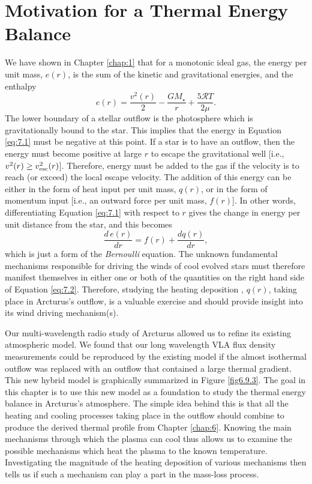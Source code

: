 \section{Motivation for a Thermal Energy Balance}\label{sec:7.1}
We have shown in Chapter \ref{chap:1} that for a monotonic ideal gas, the energy per unit mass, $e(r)$, is the sum of the kinetic and gravitational energies, and the enthalpy
\begin{equation}
\label{eq:7.1}
e(r)=\frac{v^2(r)}{2}-\frac{GM_{\star}}{r}+\frac{5\mathcal{R}T}{2\mu}.
\end{equation}
The lower boundary of a stellar outflow is the photosphere which is gravitationally bound to the star. This implies that the energy in Equation \ref{eq:7.1} must be negative at this point. If a star is to have an outflow, then the energy must become positive at large $r$ to escape the gravitational well [i.e., $v^2(r) \geq v_{\rm{esc}}^2(r)$]. Therefore, energy must be added to the gas if the velocity is to reach (or exceed) the local escape velocity. The addition of this energy can be either in the form of heat input per unit mass, $q(r)$, or in the form of momentum input [i.e., an outward force per unit mass, $f(r)$]\citep{lamers_1999}. In other words, differentiating Equation \ref{eq:7.1} with respect to $r$ gives the change in energy per unit distance from the star, and this becomes
\begin{equation}
\label{eq:7.2}
\frac{d\,e(r)}{dr}=f(r)+\frac{dq(r)}{dr},
\end{equation}
which is just a form of the \textit{Bernoulli} equation. The unknown fundamental mechanisms responsible for driving the winds of cool evolved stars must therefore manifest themselves in either one or both of the quantities on the right hand side of Equation \ref{eq:7.2}. Therefore, studying the heating deposition , $q(r)$, taking place in Arcturus's outflow, is a valuable exercise and should provide insight into its wind driving mechanism(s).

Our multi-wavelength radio study of Arcturus allowed us to refine its existing atmospheric model. We found that our long wavelength VLA flux density measurements could be reproduced by the existing model if the almost isothermal outflow was replaced with an outflow that contained a large thermal gradient. This new hybrid model is graphically summarized in Figure \ref{fig6.9.3}. The goal in this chapter is to use this new model as a foundation to study the thermal energy balance in Arcturus's atmosphere. The simple idea behind this is that all the heating and cooling processes taking place in the outflow should combine to produce the derived thermal profile from Chapter \ref{chap:6}. Knowing the main mechanisms through which the plasma can cool thus allows us to examine the possible mechanisms which heat the plasma to the known temperature. Investigating the magnitude of the heating deposition of various mechanisms then tells us if such a mechanism can play a part in the mass-loss process.

